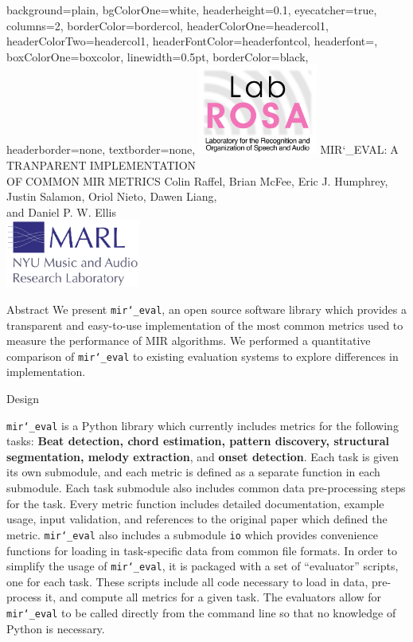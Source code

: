 \documentclass[paperwidth=120cm,paperheight=150cm,portrait,fontscale=.22,margin=5cm,lmargin=.2cm,rmargin=.2cm]{baposter}
\def\mireval{\texttt{mir\char`_eval}}
\begin{document}
\begin{poster}{
  background=plain,
  bgColorOne=white,
  headerheight=0.1\textheight,
  eyecatcher=true,
  columns=2,
  borderColor=bordercol,
  headerColorOne=headercol1,
  headerColorTwo=headercol1,
  headerFontColor=headerfontcol,
  headerfont=\textmd,
  boxColorOne=boxcolor,
  linewidth=0.5pt,
  borderColor=black,
  headerborder=none,
  textborder=none,
}
{\includegraphics[height=8em]{labrosa-new-nobg.pdf}}
{\textmd{MIR\char`_EVAL:$\;$A$\;$TRANPARENT$\;$IMPLEMENTATION\\OF$\;$COMMON$\;$MIR$\;$METRICS}}
{Colin Raffel, Brian McFee, Eric J. Humphrey, Justin Salamon, Oriol Nieto, Dawen Liang,\\[.2em] and Daniel P. W. Ellis\\[.2em]}
{\includegraphics[height=6em]{marl-logo.pdf}}

\begin{posterbox}[column=0]{Abstract}
We present \mireval{}, an open source software library which provides a transparent and easy-to-use implementation of the most common metrics used to measure the performance of MIR algorithms.
We performed a quantitative comparison of \mireval{} to existing evaluation systems to explore differences in implementation.
\end{posterbox}

\begin{posterbox}[column=0,below=auto]{Design}

\mireval{} is a Python library which currently includes metrics for the following tasks: \textbf{Beat detection, chord estimation, pattern discovery, structural segmentation, melody extraction}, and \textbf{onset detection}.
Each task is given its own submodule, and each metric is defined as a separate function in each submodule.
Each task submodule also includes common data pre-processing steps for the task.
Every metric function includes detailed documentation, example usage, input validation, and references to the original paper which defined the metric.
\mireval{} also includes a submodule \texttt{io} which provides convenience functions for loading in task-specific data from common file formats.
In order to simplify the usage of \mireval{}, it is packaged with a set of ``evaluator'' scripts, one for each task.
These scripts include all code necessary to load in data, pre-process it, and compute all metrics for a given task.
The evaluators allow for \mireval{} to be called directly from the command line so that no knowledge of Python is necessary.


\end{posterbox}
\end{poster}
\end{document}
